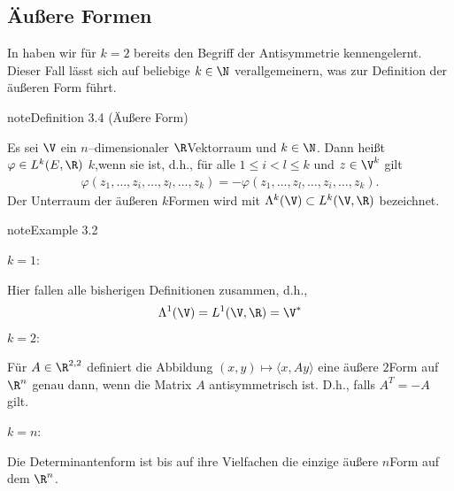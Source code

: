 \documentclass[letterpaper,10pt,english]{jupyterBook}
\begin{document}
\subsection{Äußere Formen}
\label{\detokenize{vektoranalysis/multilinear:auszere-formen}}
\sphinxAtStartPar
In {\hyperref[\detokenize{vektoranalysis/multilinear:ex:multi}]{}} haben wir für \(k=2\) bereits den Begriff der Antisymmetrie kennengelernt. Dieser Fall lässt sich auf beliebige \(k\in\N\) verallgemeinern, was zur Definition der äußeren Form führt.
\label{vektoranalysis/multilinear:aeussere_Form}
\begin{sphinxadmonition}{note}{Definition 3.4 (Äußere Form)}



\sphinxAtStartPar
Es sei \(\V\) ein \(n\)–dimensionaler \(\R\)\sphinxhyphen{}Vektorraum und \(k\in\N\). Dann heißt \(\varphi\in L^k(E,\R)\)
 \(k\),wenn sie  ist, d.h., für alle \(1\leq i<l\leq k\) und
\(z\in \V^k\) gilt
\begin{equation*}
\begin{split}\varphi(z_1,\ldots,z_i,\ldots,z_l,\ldots,z_k) =-\varphi(z_1,\ldots,z_l,\ldots,z_i,\ldots,z_k).\end{split}
\end{equation*}
\sphinxAtStartPar
Der Unterraum der äußeren \(k\)\sphinxhyphen{}Formen wird mit \(\Lambda^k(\V)\subset L^k(\V,\R)\) bezeichnet.
\end{sphinxadmonition}
\label{vektoranalysis/multilinear:example-14}
\begin{sphinxadmonition}{note}{Example 3.2}



\sphinxAtStartPar
\(k=1\):

\sphinxAtStartPar
Hier fallen alle bisherigen Definitionen zusammen, d.h.,
\begin{equation*}
\begin{split}\Lambda^1(\V) = L^1(\V,\R)= \V^\ast\end{split}
\end{equation*}
\sphinxAtStartPar
\(k=2\):

\sphinxAtStartPar
Für \(A\in\R^{2,2}\) definiert die Abbildung \((x,y)\mapsto\langle x,A y\rangle\) eine äußere \(2\)\sphinxhyphen{}Form auf \(\R^n\) genau dann, wenn die Matrix \(A\) antisymmetrisch ist. D.h., falls \(A^T=-A\) gilt.

\sphinxAtStartPar
\(k=n\):

\sphinxAtStartPar
Die Determinantenform ist bis auf ihre Vielfachen die einzige äußere \(n\)\sphinxhyphen{}Form auf dem \(\R^n\).
\end{sphinxadmonition}
\end{document}
